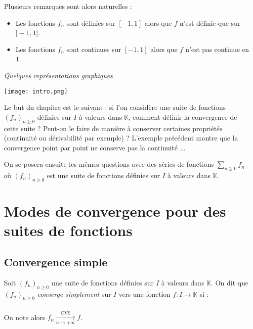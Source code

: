 \documentclass[a4paper,10pt]{report}
\newcommand{\Sum}[2]{\ensuremath{\textstyle{\sum\limits_{#1}^{#2}}}}
\begin{document}
Plusieurs remarques sont alors naturelles : 

\begin{itemize}
\item Les fonctions $f_n$ sont définies sur $[-1,1]$ alors que $f$ n'est définie que sur $]-1,1]$.
\item Les fonctions $f_n$ sont continues sur $[-1,1]$ alors que $f$ n'est pas continue en $1$.
\end{itemize}

\medskip

\begin{center}
\emph{Quelques représentations graphiques}
\end{center}

\begin{center}
\texttt{[image: intro.png]}
\end{center}

\medskip

Le but du chapitre est le suivant : si l'on considère une suite de fonctions $(f_n)_{n \geq 0}$ définies sur $I$ à valeurs dans $\mathbb{K}$, comment définir la convergence de cette suite ? Peut-on le faire de manière à conserver certaines propriétés (continuité ou dérivabilité par exemple) ? L'exemple précédent montre que la convergence \og point par point \fg ne conserve pas la continuité ...

\medskip

On se posera ensuite les mêmes questions avec des séries de fonctions $\Sum{n \geq 0}{} f_n$ où $(f_n)_{n \geq 0}$ est une suite de fonctions définies sur $I$ à valeurs dans $\mathbb{K}$.


\section{Modes de convergence pour des suites de fonctions}

\subsection{Convergence simple}

\begin{Definition}{} Soit $(f_n)_{n \geq 0}$ une suite de fonctions définies sur $I$ à valeurs dans $\mathbb{K}$. On dit que $(f_n)_{n \geq 0}$ \emph{converge simplement} sur $I$ vers une fonction $f : I \rightarrow \mathbb{K}$ si :
$$ \phantom{\forall x \in I, \quad \lim_{n \rightarrow + \infty} f_n(x) = f(x)} $$
On note alors $f_n \xrightarrow[n \rightarrow + \infty]{\textrm{CVS}} f$.
\end{Definition}
\end{document}
